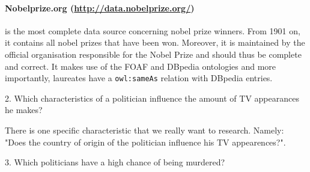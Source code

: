 \documentclass[12pt,a4paper]{article}
\begin{document}
\paragraph{\textbf{Nobelprize.org} (\url{http://data.nobelprize.org/})} is the most complete data source concerning nobel prize winners. From 1901 on, it contains all nobel prizes that have been won. Moreover, it is maintained by the official organisation responsible for the Nobel Prize and should thus be complete and correct. It makes use of the FOAF and DBpedia ontologies and more importantly, laureates have a \texttt{owl:sameAs} relation with DBpedia entries.
\vspace{1cm}

\begin{center}
	\Large
2. Which characteristics of a politician influence the amount of TV appearances he makes?
\end{center}

There is one specific characteristic that we really want to research. Namely: "Does the country of origin of the politician influence his TV appearences?". 

\begin{center}
	\Large
3. Which politicians have a high chance of being murdered?
\end{center}
\end{document}
